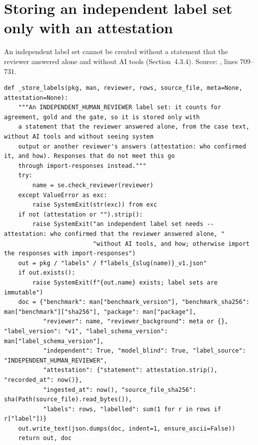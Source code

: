 \section{Storing an independent label set only with an attestation}
\label{app:A7}
An independent label set cannot be created without a statement that the reviewer answered alone and without AI tools (Section~4.3.4). Source: , lines 709--731.

\begin{lstlisting}[style=repo, firstnumber=709]
def _store_labels(pkg, man, reviewer, rows, source_file, meta=None, attestation=None):
    """An INDEPENDENT_HUMAN_REVIEWER label set: it counts for agreement, gold and the gate, so it is stored only with
    a statement that the reviewer answered alone, from the case text, without AI tools and without seeing system
    output or another reviewer's answers (attestation: who confirmed it, and how). Responses that do not meet this go
    through import-responses instead."""
    try:
        name = se.check_reviewer(reviewer)
    except ValueError as exc:
        raise SystemExit(str(exc)) from exc
    if not (attestation or "").strip():
        raise SystemExit("an independent label set needs --attestation: who confirmed that the reviewer answered alone, "
                         "without AI tools, and how; otherwise import the responses with import-responses")
    out = pkg / "labels" / f"labels_{slug(name)}_v1.json"
    if out.exists():
        raise SystemExit(f"{out.name} exists; label sets are immutable")
    doc = {"benchmark": man["benchmark_version"], "benchmark_sha256": man["benchmark"]["sha256"], "package": man["package"],
           "reviewer": name, "reviewer_background": meta or {}, "label_version": "v1", "label_schema_version": man["label_schema_version"],
           "independent": True, "model_blind": True, "label_source": "INDEPENDENT_HUMAN_REVIEWER",
           "attestation": {"statement": attestation.strip(), "recorded_at": now()},
           "ingested_at": now(), "source_file_sha256": sha(Path(source_file).read_bytes()),
           "labels": rows, "labelled": sum(1 for r in rows if r["label"])}
    out.write_text(json.dumps(doc, indent=1, ensure_ascii=False))
    return out, doc
\end{lstlisting}

